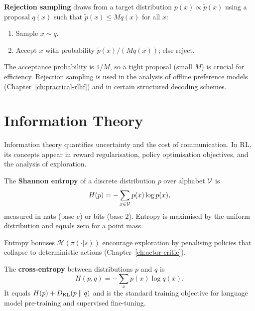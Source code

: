 \textbf{Rejection sampling} draws from a target
distribution $p(x) \propto \tilde{p}(x)$ using a proposal $q(x)$ such
that $\tilde{p}(x) \leq M q(x)$ for all $x$:

\begin{enumerate}[leftmargin=*]
    \item Sample $x \sim q$.
    \item Accept $x$ with probability $\tilde{p}(x)/(M q(x))$; else reject.
\end{enumerate}

The acceptance probability is $1/M$, so a tight proposal (small $M$) is
crucial for efficiency.  Rejection sampling is used in the analysis of
offline preference models (Chapter~\ref{ch:practical-rlhf}) and in
certain structured decoding schemes.

\section{Information Theory}
\label{app:info-theory}

Information theory quantifies uncertainty and the cost of communication.
In RL, its concepts appear in reward regularisation, policy optimisation
objectives, and the analysis of exploration.

\begin{definition}[Entropy]
\label{def:entropy}
The \textbf{Shannon entropy} of a discrete distribution $p$
over alphabet $\mathcal{V}$ is
\[
    H(p) = -\sum_{x \in \mathcal{V}} p(x)\log p(x),
\]
measured in nats (base $e$) or bits (base 2).  Entropy is maximised by
the uniform distribution and equals zero for a point mass.
\end{definition}

Entropy bonuses $\mathcal{H}(\pi(\cdot|s))$ encourage exploration by
penalising policies that collapse to deterministic actions
(Chapter~\ref{ch:actor-critic}).

\begin{definition}
\label{def:cross-entropy}
The \textbf{cross-entropy} between distributions $p$ and $q$ is
\[
    H(p,q) = -\sum_x p(x)\log q(x).
\]
It equals $H(p) + D_{\mathrm{KL}}\!\left(p\;\|\;q\right)$ and is the standard training objective for
language model pre-training and supervised fine-tuning.
\end{definition}

